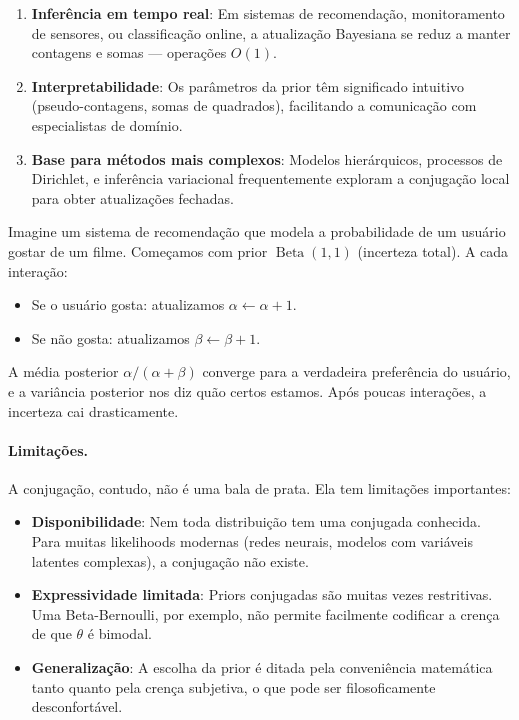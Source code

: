 \documentclass{tufte-handout}
\DeclareMathOperator{\Beta}{Beta}
\begin{document}
\begin{enumerate}
    \item \textbf{Inferência em tempo real}: Em sistemas de recomendação, monitoramento de sensores, ou classificação online, a atualização Bayesiana se reduz a manter contagens e somas --- operações $O(1)$.
    \item \textbf{Interpretabilidade}: Os parâmetros da prior têm significado intuitivo (pseudo-contagens, somas de quadrados), facilitando a comunicação com especialistas de domínio.
    \item \textbf{Base para métodos mais complexos}: Modelos hierárquicos, processos de Dirichlet, e inferência variacional frequentemente exploram a conjugação local para obter atualizações fechadas.
\end{enumerate}

\begin{exmp}
    Imagine um sistema de recomendação que modela a probabilidade de um usuário gostar de um filme. Começamos com prior $\Beta(1,1)$ (incerteza total). A cada interação:
    \begin{itemize}
        \item Se o usuário gosta: atualizamos $\alpha \leftarrow \alpha + 1$.
        \item Se não gosta: atualizamos $\beta \leftarrow \beta + 1$.
    \end{itemize}
    A média posterior $\alpha/(\alpha+\beta)$ converge para a verdadeira preferência do usuário, e a variância posterior nos diz quão certos estamos. Após poucas interações, a incerteza cai drasticamente.
\end{exmp}

\paragraph{Limitações.}

A conjugação, contudo, não é uma bala de prata. Ela tem limitações importantes:

\begin{itemize}
    \item \textbf{Disponibilidade}: Nem toda distribuição tem uma conjugada conhecida. Para muitas likelihoods modernas (redes neurais, modelos com variáveis latentes complexas), a conjugação não existe.
    \item \textbf{Expressividade limitada}: Priors conjugadas são muitas vezes restritivas. Uma Beta-Bernoulli, por exemplo, não permite facilmente codificar a crença de que $\theta$ é bimodal.
    \item \textbf{Generalização}: A escolha da prior é ditada pela conveniência matemática tanto quanto pela crença subjetiva, o que pode ser filosoficamente desconfortável.
\end{itemize}
\end{document}
